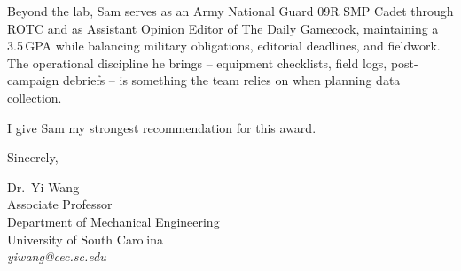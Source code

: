 \documentclass[12pt]{article}
\begin{document}
Beyond the lab, Sam serves as an Army National Guard 09R SMP Cadet through ROTC and as Assistant Opinion Editor of The Daily Gamecock, maintaining a 3.5\,GPA while balancing military obligations, editorial deadlines, and fieldwork. The operational discipline he brings -- equipment checklists, field logs, post-campaign debriefs -- is something the team relies on when planning data collection.

I give Sam my strongest recommendation for this award.

\vspace{0.5em}

\noindent
Sincerely,

\vspace{1.0em}

\noindent
Dr.\ Yi Wang\\
Associate Professor\\
Department of Mechanical Engineering\\
University of South Carolina\\
\textit{yiwang@cec.sc.edu}
\end{document}
